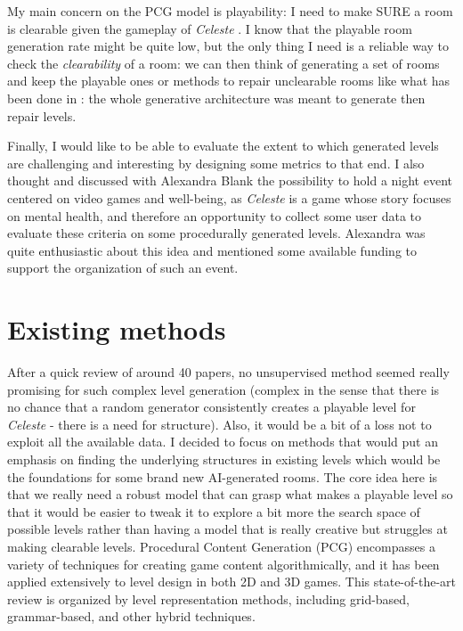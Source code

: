 \documentclass{article}
\newcommand{\Celeste}{\textit{Celeste} }
\begin{document}
\noindent My main concern on the PCG model is playability: I need to make SURE a room is clearable given the gameplay of \Celeste. I know that the playable room generation rate might be quite low, but the only thing I need is a reliable way to check the \textit{clearability} of a room: we can then think of generating a set of rooms and keep the playable ones or methods to repair unclearable rooms like what has been done in \cite{repair}: the whole generative architecture was meant to generate then repair levels.

\noindent Finally, I would like to be able to evaluate the extent to which generated levels are challenging and interesting by designing some metrics to that end. I also thought and discussed with Alexandra Blank the possibility to hold a night event centered on video games and well-being, as \Celeste is a game whose story focuses on mental health, and therefore an opportunity to collect some user data to evaluate these criteria on some procedurally generated levels. Alexandra was quite enthusiastic about this idea and mentioned some available funding to support the organization of such an event.

\section{Existing methods \label{sota}}
After a quick review of around 40 papers, no unsupervised method seemed really promising for such complex level generation (complex in the sense that there is no chance that a random generator consistently creates a playable level for \Celeste - there is a need for structure). Also, it would be a bit of a loss not to exploit all the available data. I decided to focus on methods that would put an emphasis on finding the underlying structures in existing levels which would be the foundations for some brand new AI-generated rooms. The core idea here is that we really need a robust model that can grasp what makes a playable level so that it would be easier to tweak it to explore a bit more the search space of possible levels rather than having a model that is really creative but struggles at making clearable levels. Procedural Content Generation (PCG) encompasses a variety of techniques for creating game content algorithmically, and it has been applied extensively to level design in both 2D and 3D games. This state-of-the-art review is organized by level representation methods, including grid-based, grammar-based, and other hybrid techniques.
\end{document}
